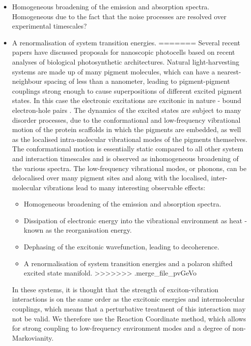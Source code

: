 \documentclass[]{article}
\begin{document}
\begin{itemize}
	\item Homogeneous broadening of the emission and absorption spectra. Homogeneous due to the fact that the noise processes are resolved over experimental timescales?
	\item A renormalisation of system transition energies.
=======
Several recent papers have discussed proposals for nanoscopic photocells based on recent analyses of biological photosynthetic architectures\cite{Dorfman}\cite{Creatore2013}\cite{Killoran2015}\cite{Fruchtman2016}. Natural light-harvesting systems are made up of many pigment molecules, which can have a nearest-neighbour spacing of less than a nanometer\cite{Adolphs2006}, leading to pigment-pigment couplings strong enough to cause superpositions of different excited pigment states. In this case the electronic excitations are excitonic in nature - bound electron-hole pairs . The dynamics of the excited states are subject to many disorder processes, due to the conformational and low-frequency vibrational motion of the protein scaffolds in which the pigments are embedded, as well as the localised intra-molecular vibrational modes of the pigments themselves. The conformational motion is essentially static compared to all other system and interaction timescales and is observed as inhomogeneous broadening of the various spectra. The low-frequency vibrational modes, or phonons, can be delocalised over many pigment sites and along with the localised, inter-molecular vibrations lead to many interesting observable effects:
\begin{itemize}
	\item Homogeneous broadening of the emission and absorption spectra.
	\item Dissipation of electronic energy into the vibrational environment as heat - known as the reorganisation energy.
	\item Dephasing of the excitonic wavefunction, leading to decoherence.
	\item A renormalisation of system transition energies and a polaron shifted excited state manifold.
>>>>>>> .merge_file_pvGeVo
\end{itemize}
In these systems, it is thought that the strength of exciton-vibration interactions is on the same order as the excitonic energies and intermolecular couplings, which means that a perturbative treatment of this interaction may not be valid. We therefore use the Reaction Coordinate method, which allows for strong coupling to low-frequency environment modes and a degree of non-Markovianity. 

\end{itemize}
\end{document}
